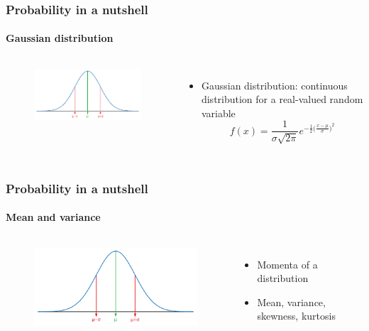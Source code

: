 \documentclass[aspectratio=43]{beamer}
\begin{document}
\begin{frame}

	\frametitle{Probability in a nutshell}
	\framesubtitle{Gaussian distribution}
	
	\footnotesize
	
	\begin{columns}	
	
		
		\begin{figure}
			\includegraphics[width =  5 cm]{plots/part1/gaussian.png}
		\end{figure}
		
		
		\begin{itemize}
			\item Gaussian distribution: continuous distribution for a real-valued random variable
			\begin{equation}
				f(x) = \frac{1}{\sigma \sqrt{2\pi}} e^{-\frac{1}{2}\big( \frac{x - \mu}{\sigma} \big)^{2}} \nonumber
			\end{equation}
		\end{itemize}
		
	\end{columns}

\end{frame}

\begin{frame}
	
	\frametitle{Probability in a nutshell}
	\framesubtitle{Mean and variance}
	
	\footnotesize
	
	\begin{columns}	
		
		\column{0.4\textwidth}
		
		\begin{figure}
			\includegraphics[width = 5 cm]{plots/part1/gaussian.png}
		\end{figure}
		
		\column{0.6\textwidth}
		
		\begin{itemize}
			\item Momenta of a distribution
			\item Mean, variance, skewness, kurtosis
		\end{itemize}
		
	\end{columns}

\end{frame}
\end{document}
